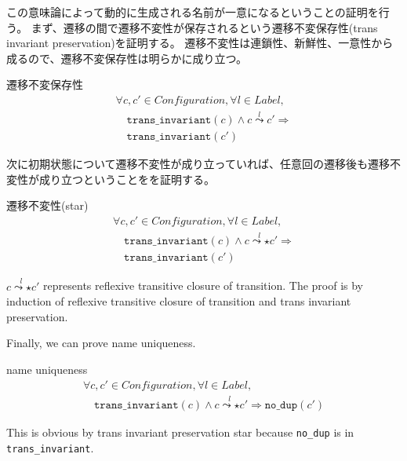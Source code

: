 この意味論によって動的に生成される名前が一意になるということの証明を行う。
まず、遷移の間で遷移不変性が保存されるという遷移不変保存性(trans invariant preservation)を証明する。
遷移不変性は連鎖性、新鮮性、一意性から成るので、遷移不変保存性は明らかに成り立つ。

\begin{lemma}{遷移不変保存性}
  \begin{displaymath}
    \begin{array}{l}
      \forall c, c' \in \textit{Configuration}, \forall l \in \textit{Label}, \\
      \quad \texttt{trans\_invariant}(c) \wedge c \overset{l}{\leadsto} c' \Rightarrow \\
      \quad \texttt{trans\_invariant}(c')
    \end{array}
  \end{displaymath}
\end{lemma}

次に初期状態について遷移不変性が成り立っていれば、任意回の遷移後も遷移不変性が成り立つということをを証明する。

\begin{lemma}{遷移不変性(star)}
  \begin{displaymath}
    \begin{array}{l}
      \forall c, c' \in \textit{Configuration}, \forall l \in \textit{Label}, \\
      \quad \texttt{trans\_invariant}(c) \wedge c \overset{l}{\leadsto\star} c' \Rightarrow \\
      \quad \texttt{trans\_invariant}(c')
    \end{array}
  \end{displaymath}
\end{lemma}

$c \overset{l}{\leadsto\star} c'$ represents reflexive transitive closure of transition.
The proof is by induction of reflexive transitive closure of transition and trans invariant preservation.

Finally, we can prove name uniqueness.
\begin{theorem}{name uniqueness}
  \begin{displaymath}
    \begin{array}{l}
      \forall c, c' \in \textit{Configuration}, \forall l \in \textit{Label}, \\
      \quad \texttt{trans\_invariant}(c) \wedge c \overset{l}{\leadsto\star} c' \Rightarrow \texttt{no\_dup}(c')
    \end{array}
  \end{displaymath}
\end{theorem}
This is obvious by trans invariant preservation star because \texttt{no\_dup} is in \texttt{trans\_invariant}.



